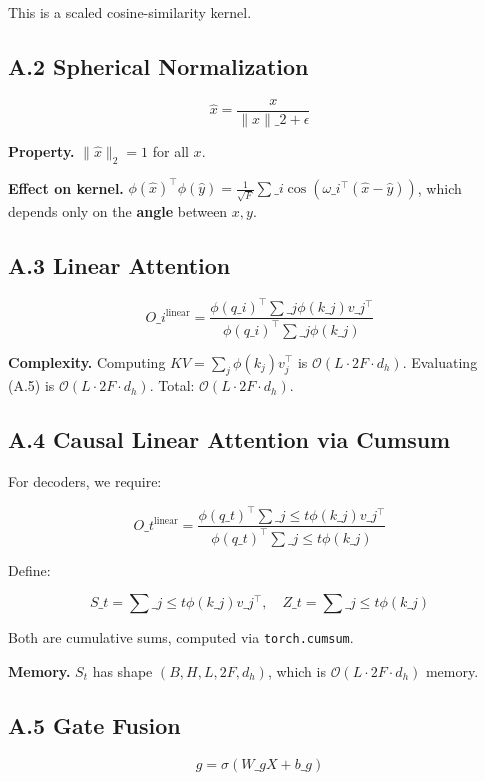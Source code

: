 This is a scaled cosine-similarity kernel.

\subsection{A.2 Spherical Normalization}

\[
\hat{x} = \frac{x}{\|x\|\_2 + \epsilon}
\]

\textbf{Property.} $\|\hat{x}\|_2 = 1$ for all $x$.

\textbf{Effect on kernel.} $\phi(\hat{x})^\top \phi(\hat{y}) = \frac{1}{\sqrt{F}} 
\sum\_i \cos(\omega\_i^\top (\hat{x} - \hat{y}))$, which depends only on the 
\textbf{angle} between $x, y$.

\subsection{A.3 Linear Attention}

\[
O\_i^\text{linear} = \frac{\phi(q\_i)^\top \sum\_j \phi(k\_j) v\_j^\top}{\phi(q\_i)^\top \sum\_j \phi(k\_j)}
\]

\textbf{Complexity.} Computing $KV = \sum_j \phi(k_j) v_j^\top$ is 
$\mathcal{O}(L \cdot 2F \cdot d_h)$. Evaluating (A.5) is $\mathcal{O}(L \cdot 2F \cdot d_h)$. Total: $\mathcal{O}(L \cdot 2F \cdot d_h)$.

\subsection{A.4 Causal Linear Attention via Cumsum}

For decoders, we require:

\[
O\_t^\text{linear} = \frac{\phi(q\_t)^\top \sum\_{j \leq t} \phi(k\_j) v\_j^\top}{\phi(q\_t)^\top \sum\_{j \leq t} \phi(k\_j)}
\]

Define:

\[
S\_t = \sum\_{j \leq t} \phi(k\_j) v\_j^\top, \quad
Z\_t = \sum\_{j \leq t} \phi(k\_j)
\]

Both are cumulative sums, computed via \texttt{torch.cumsum}.

\textbf{Memory.} $S_t$ has shape $(B, H, L, 2F, d_h)$, which is 
$\mathcal{O}(L \cdot 2F \cdot d_h)$ memory.

\subsection{A.5 Gate Fusion}

\[
g = \sigma(W\_g X + b\_g)
\]


